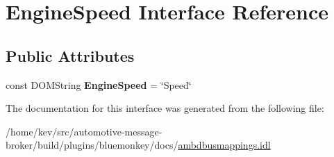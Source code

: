 \hypertarget{interfaceEngineSpeed}{\section{Engine\+Speed Interface Reference}
\label{interfaceEngineSpeed}
}
\subsection*{Public Attributes}
\begin{DoxyCompactItemize}
\item 
\hypertarget{interfaceEngineSpeed_ac3274655997a773e5ba9d9d7c0f7dd03}{const D\+O\+M\+String {\bfseries Engine\+Speed} = \char`\"{}Speed\char`\"{}}\label{interfaceEngineSpeed_ac3274655997a773e5ba9d9d7c0f7dd03}

\end{DoxyCompactItemize}


The documentation for this interface was generated from the following file\+:\begin{DoxyCompactItemize}
\item 
/home/kev/src/automotive-\/message-\/broker/build/plugins/bluemonkey/docs/\hyperlink{ambdbusmappings_8idl}{ambdbusmappings.\+idl}\end{DoxyCompactItemize}
